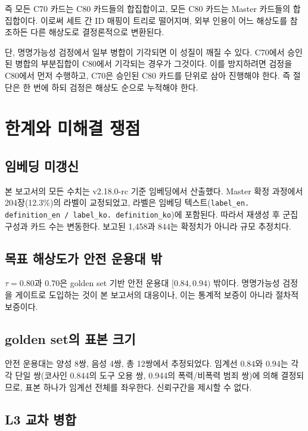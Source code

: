 \documentclass[11pt,a4paper]{article}
\begin{document}
즉 모든 C70 카드는 C80 카드들의 합집합이고, 모든 C80 카드는 Master 카드들의 합집합이다. 이로써 세트 간 ID 매핑이 트리로 떨어지며, 외부 인용이 어느 해상도를 참조하든 다른 해상도로 결정론적으로 변환된다.

단, 명명가능성 검정에서 일부 병합이 기각되면 이 성질이 깨질 수 있다. C70에서 승인된 병합의 부분집합이 C80에서 기각되는 경우가 그것이다. 이를 방지하려면 검정을 C80에서 먼저 수행하고, C70은 승인된 C80 카드를 단위로 삼아 진행해야 한다. 즉 절단은 한 번에 하되 검정은 해상도 순으로 누적해야 한다.

\section{한계와 미해결 쟁점}
\label{sec:limits}

\subsection{임베딩 미갱신}

본 보고서의 모든 수치는 v2.18.0-rc 기준 임베딩에서 산출했다. Master 확정 과정에서 204장(12.3\%)의 라벨이 교정되었고, 라벨은 임베딩 텍스트(\texttt{label\_en. definition\_en / label\_ko. definition\_ko})에 포함된다. 따라서 재생성 후 군집 구성과 카드 수는 변동한다. 보고된 1{,}458과 844는 확정치가 아니라 규모 추정치다.

\subsection{목표 해상도가 안전 운용대 밖}

$\tau=0.80$과 $0.70$은 golden set 기반 안전 운용대 $[0.84, 0.94)$ 밖이다. 명명가능성 검정을 게이트로 도입하는 것이 본 보고서의 대응이나, 이는 통계적 보증이 아니라 절차적 보증이다.

\subsection{golden set의 표본 크기}

안전 운용대는 양성 8쌍, 음성 4쌍, 총 12쌍에서 추정되었다. 임계선 $0.84$와 $0.94$는 각각 단일 쌍(코사인 0.844의 도구 오용 쌍, 0.944의 폭력/비폭력 범죄 쌍)에 의해 결정되므로, 표본 하나가 임계선 전체를 좌우한다. 신뢰구간을 제시할 수 없다.

\subsection{L3 교차 병합}
\end{document}
